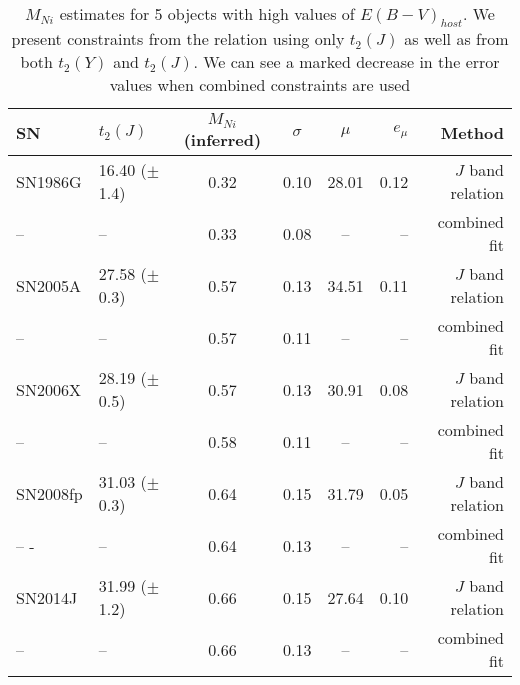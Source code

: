 \begin{table*}



\begin{center}
\caption{$M_{Ni}$ estimates for 5 objects with high values of $E(B-V)_{host}$. We present constraints from the relation using only $t_2(J)$ as well as from both $t_2(Y)$ and $t_2(J)$. We can see a marked decrease in the error values when combined constraints are used}
\begin{tabular}{llcccrr}
\hline
SN & $t_2(J)$ & $M_{Ni}$ (inferred) & $\sigma$ & $\mu$ & $e_{\mu}$ & Method \\
\hline
SN1986G	& 16.40 ($\pm$ 1.4)	&	0.32 & 0.10	& 28.01 & 0.12 & $J$ band relation \\
-- & --	& 0.33	& 0.08	&--&--& combined fit \\
SN2005A	& 27.58 ($\pm$ 0.3)	& 0.57	&  0.13 & 34.51 & 0.11  & $J$ band relation \\
-- & -- &	0.57	& 0.11	&--&--& combined fit \\
SN2006X	& 28.19  ($\pm$ 0.5)	& 0.57 & 0.13 &	 30.91 & 0.08 & $J$ band relation \\
-- & -- &	0.58	& 0.11	&--&--& combined fit \\
SN2008fp & 31.03 ($\pm$ 0.3)	& 0.64	& 0.15 & 31.79 & 0.05 & $J$ band relation \\
-- 	- &-- & 0.64	& 0.13	&--&--& combined fit		\\
SN2014J	& 31.99 ($\pm$ 1.2)	& 0.66	& 0.15 &  27.64 & 0.10   & $J$ band relation\\
--	& -- & 0.66  & 0.13 &--&--& combined fit \\
\hline
\end{tabular}

\label{tab:red}

\end{center}




\end{table*}
